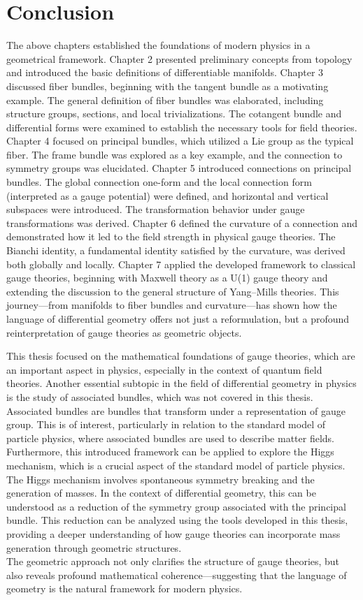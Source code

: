 
\chapter{Conclusion}

The above chapters established the foundations of modern physics in a geometrical framework. Chapter 2 presented preliminary concepts from topology and introduced the basic definitions of differentiable manifolds. Chapter 3 discussed fiber bundles, beginning with the tangent bundle as a motivating example. The general definition of fiber bundles was elaborated, including structure groups, sections, and local trivializations. The cotangent bundle and differential forms were examined to establish the necessary tools for field theories. Chapter 4 focused on principal bundles, which utilized a Lie group as the typical fiber. The frame bundle was explored as a key example, and the connection to symmetry groups was elucidated. Chapter 5 introduced connections on principal bundles. The global connection one-form and the local connection form (interpreted as a gauge potential) were defined, and horizontal and vertical subspaces were introduced. The transformation behavior under gauge transformations was derived. Chapter 6 defined the curvature of a connection and demonstrated how it led to the field strength in physical gauge theories. The Bianchi identity, a fundamental identity satisfied by the curvature, was derived both globally and locally. Chapter 7 applied the developed framework to classical gauge theories, beginning with Maxwell theory as a U(1) gauge theory and extending the discussion to the general structure of Yang–Mills theories. This journey—from manifolds to fiber bundles and curvature—has shown how the language of differential geometry offers not just a reformulation, but a profound reinterpretation of gauge theories as geometric objects.

This thesis focused on the mathematical foundations of gauge theories, which are an important aspect in physics, especially in the context of quantum field theories. Another essential subtopic in the field of differential geometry in physics is the study of associated bundles, which was not covered in this thesis. Associated bundles are bundles that transform under a representation of gauge group. This is of interest, particularly in relation to the standard model of particle physics, where associated bundles are used to describe matter fields.
\\
Furthermore, this introduced framework can be applied to explore the Higgs mechanism, which is a crucial aspect of the standard model of particle physics. The Higgs mechanism involves spontaneous symmetry breaking and the generation of masses. In the context of differential geometry, this can be understood as a reduction of the symmetry group associated with the principal bundle. This reduction can be analyzed using the tools developed in this thesis, providing a deeper understanding of how gauge theories can incorporate mass generation through geometric structures.
\\
The geometric approach not only clarifies the structure of gauge theories, but also reveals profound mathematical coherence—suggesting that the language of geometry is the natural framework for modern physics.
